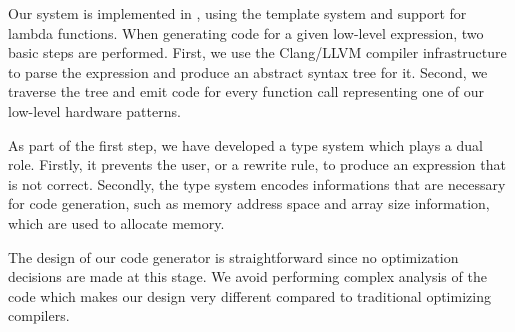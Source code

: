 Our system is implemented in \Cpp, using the template system and support for lambda functions. 
When generating code for a given low-level expression, two basic steps are performed.
First, we use the Clang/LLVM compiler infrastructure to parse the expression and produce an abstract syntax tree for it.
Second, we traverse the tree and emit code for every function call representing one of our low-level hardware patterns.

As part of the first step, we have developed a type system which plays a dual role.
Firstly, it prevents the user, or a rewrite rule, to produce an expression that is not correct.
Secondly, the type system encodes informations that are necessary for code generation, such as memory address space and array size information, which are used to allocate memory.

The design of our code generator is straightforward since no optimization decisions are made at this stage.
We avoid performing complex analysis of the code which makes our design very different compared to traditional optimizing compilers.

